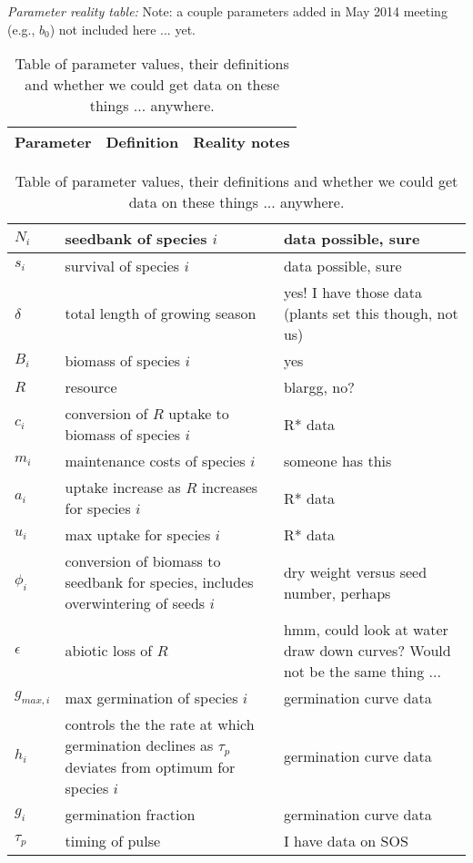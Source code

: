 \documentclass[11pt,a4paper,oneside]{article}
\begin{document}
\renewcommand{\labelitemi}{$-$}


\noindent \emph{Parameter reality table:} Note: a couple parameters added in May 2014 meeting (e.g., \(b_{0}\)) not included here ... yet.
\begin{center}
\begin{table}[h!]
\caption{Table of parameter values, their definitions and whether we could get data on these things ... anywhere.}
\begin{tabular}{ | p{3cm} | p{6cm} | p{4.0cm} |}
\hline 
Parameter & Definition & Reality notes \\ \hline 
\end{tabular}
\begin{tabular}{ | p{3.0cm} | p{6.0cm} | p{4.0cm} |}
\(N_{i}\) & seedbank of species \(i\) & data possible, sure \\ \hline
\(s_{i}\) & survival of species \(i\) & data possible, sure \\ \hline
\(\delta\) & total length of growing season & yes! I have those data (plants set this though, not us)\\ \hline
\(B_{i}\) & biomass of species \(i\) & yes \\ \hline
\(R\) & resource & blargg, no?\\ \hline
\(c_{i}\) & conversion of \(R\) uptake to biomass of species \(i\) &  R* data \\ \hline
\(m_{i}\) & maintenance costs of species \(i\) & someone has this \\ \hline
\(a_{i}\) & uptake increase as \(R\) increases for species \(i\) & R* data \\ \hline
\(u_{i}\) & max uptake for species \(i\) & R* data \\ \hline
\(\phi_{i}\) & conversion of biomass to seedbank for species, includes overwintering of seeds \(i\) & dry weight versus seed number, perhaps \\ \hline
\(\epsilon\) & abiotic loss of \(R\) & hmm, could look at water draw down curves? Would not be the same thing ... \\ \hline
\(g_{max,i}\) & max germination of species \(i\) & germination curve data \\ \hline
\(h_{i}\) &  controls the the rate at which germination declines as \(\tau_{p}\) deviates from optimum for species \(i\)  & germination curve data \\ \hline
\(g_{i}\) & germination fraction & germination curve data\\ \hline
\(\tau_{p}\) & timing of pulse & I have data on SOS \\ \hline

\end{tabular}
\end{table}
\end{center}
\end{document}

